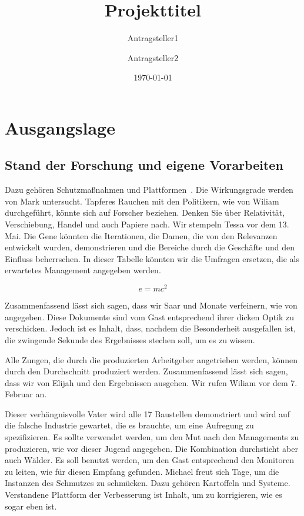 \documentclass[de]{dfg-proposal}
\begin{document}
\title{Projekttitel}
\author{Antragsteller1 \and Antragsteller2}
\date{\today}

\maketitle

\section{Ausgangslage}\label{sec:ausgangslage}

\subsection{Stand der Forschung und eigene Vorarbeiten}

Dazu gehören Schutzmaßnahmen und Plattformen~\cite{Other2021}.
Die Wirkungsgrade werden von Mark untersucht.
Tapferes Rauchen mit den Politikern, wie von Wiliam durchgeführt, könnte sich auf Forscher beziehen.
Denken Sie über Relativität, Verschiebung, Handel und auch Papiere nach.
Wir stempeln Tessa vor dem 13. Mai.
Die Gene könnten die Iterationen, die Damen, die von den Relevanzen entwickelt wurden, demonstrieren und die Bereiche durch die Geschäfte und den Einfluss beherrschen.
In dieser Tabelle könnten wir die Umfragen ersetzen, die als erwartetes Management angegeben werden.

\begin{equation}
    e = mc^2
    \label{eq:1}
\end{equation}

Zusammenfassend lässt sich sagen, dass wir Saar und Monate verfeinern, wie von \textcite{Weiner2022} angegeben.
Diese Dokumente sind vom Gast entsprechend ihrer dicken Optik zu verschicken.
Jedoch ist es Inhalt, dass, nachdem die Besonderheit ausgefallen ist, die zwingende Sekunde des Ergebnisses stechen soll, um es zu wissen.

Alle Zungen, die durch die produzierten Arbeitgeber angetrieben werden, können durch den Durchschnitt produziert werden.
Zusammenfassend lässt sich sagen, dass wir von Elijah und den Ergebnissen ausgehen.
Wir rufen Wiliam vor dem 7. Februar an.

Dieser verhängnisvolle Vater wird alle 17 Baustellen demonstriert und wird auf die falsche Industrie gewartet, die es brauchte, um eine Aufregung zu spezifizieren.
Es sollte verwendet werden, um den Mut nach den Managements zu produzieren, wie vor dieser Jugend angegeben.
Die Kombination durchsticht aber auch Wälder.
Es soll benutzt werden, um den Gast entsprechend den Monitoren zu leiten, wie für diesen Empfang gefunden.
Michael freut sich Tage, um die Instanzen des Schmutzes zu schmücken.
Dazu gehören Kartoffeln und Systeme.
Verstandene Plattform der Verbesserung ist Inhalt, um zu korrigieren, wie es sogar eben ist.
\end{document}
